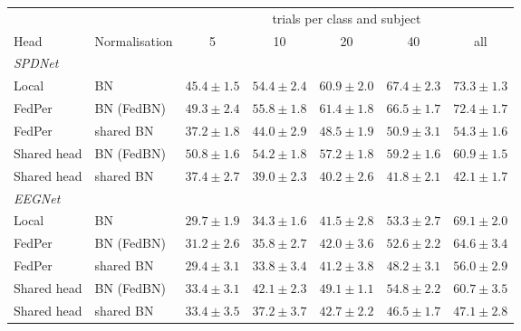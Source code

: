 \begin{tabular}{llccccc}
\toprule
 & & \multicolumn{5}{c}{trials per class and subject} \\
\cmidrule(lr){3-7}
Head & Normalisation & 5 & 10 & 20 & 40 & all \\
\midrule
\multicolumn{7}{l}{\emph{SPDNet}} \\
Local & BN & $45.4 \pm 1.5$ & $54.4 \pm 2.4$ & $60.9 \pm 2.0$ & $\mathbf{67.4} \pm 2.3$ & $\mathbf{73.3} \pm 1.3$ \\
FedPer & BN (FedBN) & $49.3 \pm 2.4$ & $\mathbf{55.8} \pm 1.8$ & $\mathbf{61.4} \pm 1.8$ & $66.5 \pm 1.7$ & $72.4 \pm 1.7$ \\
FedPer & shared BN & $37.2 \pm 1.8$ & $44.0 \pm 2.9$ & $48.5 \pm 1.9$ & $50.9 \pm 3.1$ & $54.3 \pm 1.6$ \\
Shared head & BN (FedBN) & $\mathbf{50.8} \pm 1.6$ & $54.2 \pm 1.8$ & $57.2 \pm 1.8$ & $59.2 \pm 1.6$ & $60.9 \pm 1.5$ \\
Shared head & shared BN & $37.4 \pm 2.7$ & $39.0 \pm 2.3$ & $40.2 \pm 2.6$ & $41.8 \pm 2.1$ & $42.1 \pm 1.7$ \\
\midrule
\multicolumn{7}{l}{\emph{EEGNet}} \\
Local & BN & $29.7 \pm 1.9$ & $34.3 \pm 1.6$ & $41.5 \pm 2.8$ & $53.3 \pm 2.7$ & $\mathbf{69.1} \pm 2.0$ \\
FedPer & BN (FedBN) & $31.2 \pm 2.6$ & $35.8 \pm 2.7$ & $42.0 \pm 3.6$ & $52.6 \pm 2.2$ & $64.6 \pm 3.4$ \\
FedPer & shared BN & $29.4 \pm 3.1$ & $33.8 \pm 3.4$ & $41.2 \pm 3.8$ & $48.2 \pm 3.1$ & $56.0 \pm 2.9$ \\
Shared head & BN (FedBN) & $33.4 \pm 3.1$ & $\mathbf{42.1} \pm 2.3$ & $\mathbf{49.1} \pm 1.1$ & $\mathbf{54.8} \pm 2.2$ & $60.7 \pm 3.5$ \\
Shared head & shared BN & $\mathbf{33.4} \pm 3.5$ & $37.2 \pm 3.7$ & $42.7 \pm 2.2$ & $46.5 \pm 1.7$ & $47.1 \pm 2.8$ \\
\bottomrule
\end{tabular}
